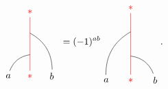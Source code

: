 \begin{enumerate}
			\begin{equation}
				\begin{tikzpicture}[scale=0.8,baseline=(current bounding box.center)]
				\node[red](m) at (0,0) {$*$};
				\node(a) at (-1,0) {$a$};
				\node(b) at (1,0) {$b$};
				\node[red](abm) at (0,3) {$*$};
				\draw[red] (m) -- (abm);
				\draw (a) to [bend left] (0,1);
				\draw (b) to [bend right] (0,2);
				\end{tikzpicture}\ =(-1)^{ab}
				\begin{tikzpicture}[scale=0.9,baseline=(current bounding box.center)]
				\node[red](m) at (0,0) {$*$};
				\node(a) at (-1,0) {$a$};
				\node(b) at (1,0) {$b$};
				\node[red](abm) at (0,3) {$*$};
				\draw[red] (m) -- (abm);
				\draw (b) to [bend right] (0,1);
				\draw (a) to [bend left] (0,2);
				\end{tikzpicture}.\label{eqn:F1}
			\end{equation}
	\end{enumerate}

